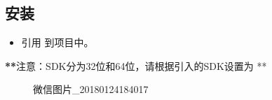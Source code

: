 \documentclass[letterpaper,10pt,english]{sphinxmanual}
\begin{document}
\subsection{安装}
\label{\detokenize{csharp:id2}}\begin{itemize}
\item {} 
引用 到项目中。

\end{itemize}

{\color{red}\bfseries{}**}注意：SDK分为32位和64位，请根据引入的SDK设置为  **

\begin{figure}[htbp]
\centering
\capstart

\noindent{}
\caption{微信图片\_20180124184017}\label{\detokenize{csharp:id93}}\end{figure}
\end{document}
